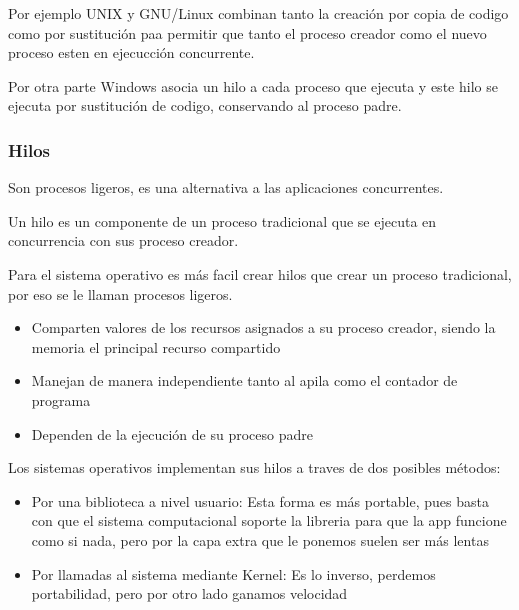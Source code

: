\documentclass[12pt, fleqn]{report}                             %
\begin{document}
                Por ejemplo UNIX y GNU/Linux combinan tanto la creación por copia de codigo como por
                sustitución paa permitir que tanto el proceso creador como el nuevo proceso esten 
                en ejecucción concurrente.

                Por otra parte Windows asocia un hilo a cada proceso que ejecuta y este hilo se ejecuta por
                sustitución de codigo, conservando al proceso padre.


                \subsubsection{Hilos}

                    Son procesos ligeros, es una alternativa a las aplicaciones concurrentes.

                    Un hilo es un componente de un proceso tradicional que se ejecuta en concurrencia con
                    sus proceso creador.

                    Para el sistema operativo es más facil crear hilos que crear un proceso tradicional, por eso se
                    le llaman procesos ligeros.

                    \begin{itemize}
                        \item Comparten valores de los recursos asignados a su proceso creador,
                            siendo la memoria el principal recurso compartido

                        \item Manejan de manera independiente tanto al apila como el contador de programa
                        
                        \item Dependen de la ejecución de su proceso padre

                    \end{itemize}

                    Los sistemas operativos implementan sus hilos a traves de dos posibles métodos:
                    \begin{itemize}

                        \item Por una biblioteca a nivel usuario:
                            Esta forma es más portable, pues basta con que el sistema computacional soporte 
                            la libreria para que la app funcione como si nada, pero por la capa extra que le ponemos
                            suelen ser más lentas

                        \item Por llamadas al sistema mediante Kernel:
                            Es lo inverso, perdemos portabilidad, pero por otro lado ganamos velocidad

                    \end{itemize}
\end{document}
